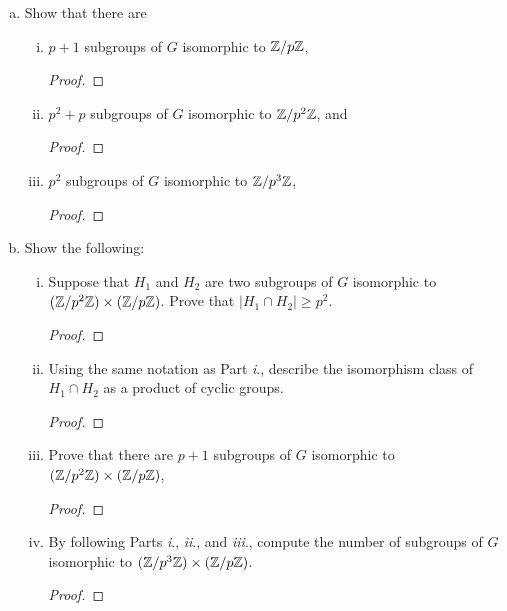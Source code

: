 \begin{itemize}
\begin{enumerate}[(a)]
\item Show that there are
    \begin{enumerate}[(i)]
        \item $p + 1$ subgroups of $G$ isomorphic to $\mathbb{Z}/p\mathbb{Z}$,
        \begin{proof}

        \end{proof}
        
        \item $p^2 + p$ subgroups of $G$ isomorphic to $\mathbb{Z}/p^2\mathbb{Z}$, and 
        \begin{proof}

        \end{proof}
        
        \item $p^2$ subgroups of $G$ isomorphic to $\mathbb{Z}/p^3\mathbb{Z}$,
        \begin{proof}

        \end{proof}
    \end{enumerate}

\item Show the following:
    \begin{enumerate}[(i)]
        \item Suppose that $H_1$ and $H_2$ are two subgroups of $G$ isomorphic to $(\mathbb{Z}/p^2\mathbb{Z}) \times (\mathbb{Z}/p\mathbb{Z})$. Prove that $|H_1 \cap H_2| \geq p^2$.
        \begin{proof}

        \end{proof}
        
        \item Using the same notation as Part \textit{i}., describe the isomorphism class of $H_1 \cap H_2$ as a product of cyclic groups.
        \begin{proof}

        \end{proof}
        
        \item Prove that there are $p+1$ subgroups of $G$ isomorphic to $(\mathbb{Z}/p^2\mathbb{Z}) \times (\mathbb{Z}/p\mathbb{Z})$,
        \begin{proof}

        \end{proof}
        
        \item By following Parts \textit{i}., \textit{ii}., and \textit{iii}., compute the number of subgroups of $G$ isomorphic to $(\mathbb{Z}/p^3\mathbb{Z}) \times (\mathbb{Z}/p\mathbb{Z})$.
        \begin{proof}


\end{proof}
\end{enumerate}
\end{enumerate}
\end{itemize}

